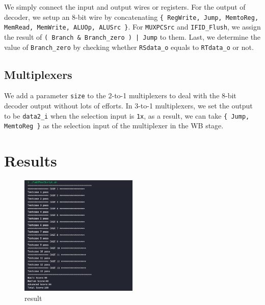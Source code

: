\documentclass{article}
\begin{document}
    We simply connect the input and output wires or registers. For the output of decoder, 
    we setup an 8-bit wire by concatenating \verb|{ RegWrite, Jump, MemtoReg, MemRead, MemWrite, ALUOp, ALUSrc }|.
    For \verb|MUXPCSrc| and \verb|IFID_Flush|, we assign the result of \verb+( Branch & Branch_zero ) | Jump+ to them.
    Last, we determine the value of \verb|Branch_zero| by checking whether \verb|RSdata_o| equals to \verb|RTdata_o| or not.

\subsection{Multiplexers}

    We add a parameter \verb|size| to the 2-to-1 multiplexers to deal with the 8-bit decoder output without lots of efforts.
    In 3-to-1 multiplexers, we set the output to be \verb|data2_i| when the selection input is \verb|1x|, 
    as a result, we can take \verb|{ Jump, MemtoReg }| as the selection input of the multiplexer in the WB stage.

\newpage

\section{Results}
\begin{figure}[!htb]
    \centering
    \includegraphics[width=0.5\textwidth]{result.png}
    \caption{result}
\end{figure}
\end{document}
